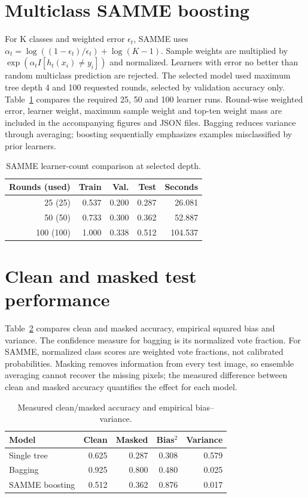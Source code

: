 \documentclass[10pt,twocolumn,letterpaper]{article}
\begin{document}
\section{Multiclass SAMME boosting}
For K classes and weighted error $\epsilon_t$, SAMME uses $\alpha_t=\log((1-\epsilon_t)/\epsilon_t)+\log(K-1)$. Sample weights are multiplied by $\exp(\alpha_t I[h_t(x_i)\ne y_i])$ and normalized. Learners with error no better than random multiclass prediction are rejected. The selected model used maximum tree depth 4
 and 100 requested rounds, selected by validation accuracy only. Table~\ref{tab:boostcompare} compares the required 25, 50 and 100 learner runs. Round-wise weighted error, learner weight, maximum sample weight and top-ten weight mass are included in the accompanying figures and JSON files. Bagging reduces variance through averaging; boosting sequentially emphasizes examples misclassified by prior learners.
\begin{table}[t]\centering\scriptsize
\caption{SAMME learner-count comparison at selected depth.}\label{tab:boostcompare}
\begin{tabular}{rrrrr}\toprule
Rounds (used) & Train & Val. & Test & Seconds\\\midrule
25 (25) & 0.537 & 0.200 & 0.287 & 26.081 \\
50 (50) & 0.733 & 0.300 & 0.362 & 52.887 \\
100 (100) & 1.000 & 0.338 & 0.512 & 104.537 \\
\bottomrule\end{tabular}\end{table}
\section{Clean and masked test performance}
Table~\ref{tab:main} compares clean and masked accuracy, empirical squared bias and variance. The confidence measure for bagging is its normalized vote fraction. For SAMME, normalized class scores are weighted vote fractions, not calibrated probabilities. Masking removes information from every test image, so ensemble averaging cannot recover the missing pixels; the measured difference between clean and masked accuracy quantifies the effect for each model.
\begin{table}[t]\centering\small
\caption{Measured clean/masked accuracy and empirical bias--variance.}\label{tab:main}
\begin{tabular}{lrrrr}\toprule
Model & Clean & Masked & Bias$^2$ & Variance\\\midrule
Single tree & 0.625 & 0.287 & 0.308 & 0.579 \\
Bagging & 0.925 & 0.800 & 0.480 & 0.025 \\
SAMME boosting & 0.512 & 0.362 & 0.876 & 0.017 \\
\bottomrule\end{tabular}\end{table}
\end{document}
